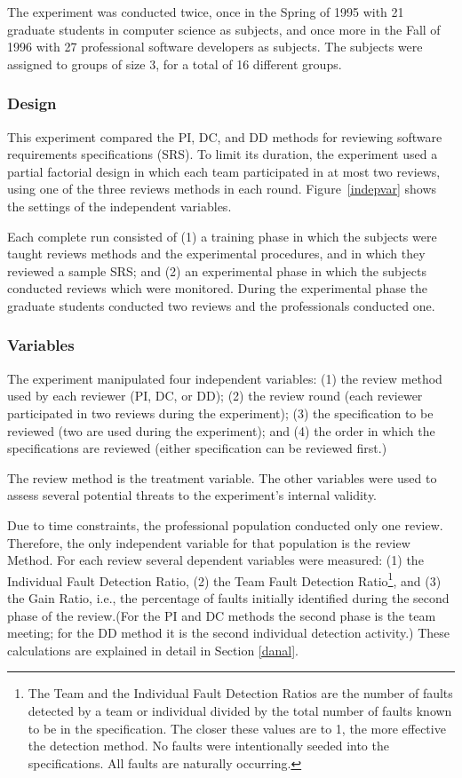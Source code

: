The experiment was conducted twice, once in the Spring of 1995 with 
21 graduate students in computer science as subjects, and once 
more in the Fall of 1996 with 27 professional software developers 
as subjects. The subjects were assigned to groups of size 3, for a total
of 16 different groups.

\subsubsection{Design}

This experiment compared the PI, DC, and DD methods 
for reviewing software requirements specifications (SRS).  To limit 
its duration, the experiment used a partial factorial design in
which each team participated in at most two reviews, using one 
of the three reviews methods in each round.  Figure~\ref{indepvar} shows 
the settings of the independent variables.

Each complete run consisted of (1) a training phase in which 
the subjects were taught reviews methods and the experimental 
procedures, and in which they reviewed a sample SRS; and (2) 
an experimental phase in which the subjects conducted 
reviews which were monitored. During the experimental phase the graduate 
students conducted two reviews and the professionals conducted 
one. 


\subsubsection{Variables}
\label{variables}
The experiment manipulated four independent variables:
(1) the review method used by each reviewer (PI, DC, or DD);
(2) the review round (each reviewer participated in two reviews 
during the experiment);
(3) the specification to be reviewed (two are used during the experiment); and
(4) the order in which the specifications are reviewed (either 
specification can be reviewed first.)

The review method is the treatment variable. The other 
variables were used to assess several potential threats to 
the experiment's internal validity. 

Due to time constraints, the professional population conducted only one 
review. Therefore, the only independent variable for that population
is the review Method. For each review several dependent variables
were measured:
(1) the Individual Fault Detection Ratio, 
(2)  the Team Fault Detection Ratio\footnote{The Team and the Individual 
Fault Detection Ratios are the 
number of faults detected by a team or individual divided by the 
total number of faults known to be in the specification.  
The closer these values are to 1, the more effective the detection method. 
No faults were intentionally seeded into the specifications. All 
faults are naturally occurring.}, and 
(3) the Gain Ratio, i.e., the percentage of faults 
initially identified during the 
second phase of the review.(For the PI and DC methods
the second phase is the team meeting; for the DD method it is the
second individual detection activity.)
These calculations are explained in detail in Section \ref{danal}.  

